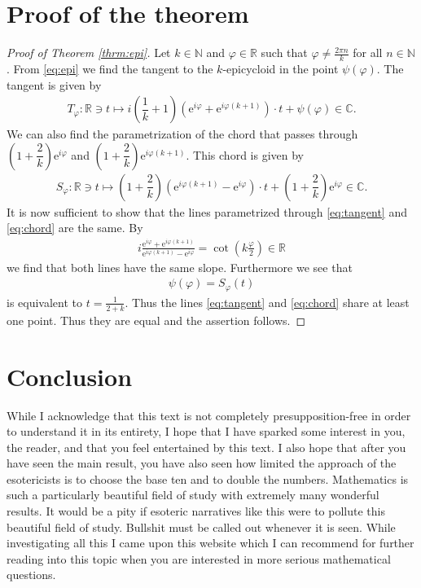 \documentclass{article}
\newcommand{\N}{\mathbb{N}}
\newcommand{\R}{\mathbb{R}}
\newcommand{\C}{\mathbb{C}}
\newcommand{\e}{\mathrm{e}}
\begin{document}
\section{Proof of the theorem}
\begin{proof}[Proof of Theorem \ref{thrm:epi}] Let $k\in\N$ and $\varphi\in\R$ such that 
	$\varphi\neq \frac{2\pi n}{k}$ for all $n\in\N$. From \eqref{eq:epi} we find the tangent to the $k$-epicycloid in the 
	point $\psi(\varphi)$. The tangent is given by
    \begin{align}\label{eq:tangent}
        T_{\varphi}\colon\R\ni t\mapsto i\left(\dfrac{1}{k}+1\right)\left(\e^{i\varphi}+\e^{i\varphi(k+1)}\right)\cdot t+\psi(\varphi)\in\C.
    \end{align}
    We can also find the parametrization of the chord that passes through 
    $\left(1 + \dfrac{2}{k}\right)\e^{i\varphi}$ and $\left(1 + \dfrac{2}{k}\right)\e^{i\varphi(k+1)}$. This chord is given by
    \begin{align}\label{eq:chord}
        S_{\varphi}\colon\R\ni t\mapsto \left(1+\dfrac{2}{k}\right)\left(\e^{i\varphi(k+1)}-\e^{i\varphi}\right)\cdot t + \left(1+\dfrac{2}{k}\right)\e^{i\varphi}\in\C.
    \end{align}
    It is now sufficient to show that the lines parametrized through \eqref{eq:tangent} and \eqref{eq:chord} are the same. By
    \begin{align*}
        i\frac{\e^{i\varphi}+\e^{i\varphi(k+1)}}{\e^{i\varphi(k+1)}-\e^{i\varphi}} = \operatorname{cot}\left(k\frac{\varphi}{2}\right)\in\R
    \end{align*}
    we find that both lines have the same slope. Furthermore we see that 
    \begin{align*}
        \psi(\varphi) = S_{\varphi}(t)
    \end{align*}
    is equivalent to $t = \frac{1}{2+k}$. Thus the lines \eqref{eq:tangent} and \eqref{eq:chord} share at least one point. Thus they are equal and the assertion follows.
\end{proof}
\section{Conclusion}
While I acknowledge that this text is not completely presupposition-free in order to understand it in its entirety, I hope that I have sparked some 
interest in you, the reader, and that you feel entertained by this text. I also hope that after you have seen the main result, you have also seen 
how limited the approach of the esotericists is to choose the base ten and to double the numbers. Mathematics is such a particularly beautiful 
field of study with extremely many wonderful results. It would be a pity if esoteric narratives like this were to pollute this beautiful field of study. 
Bullshit must be called out whenever it is seen. While investigating all this I came upon this \cite{theproblemsite} website which I can recommend for 
further reading into this topic when you are interested in more serious mathematical questions.
\newpage
\printbibliography
\end{document}
